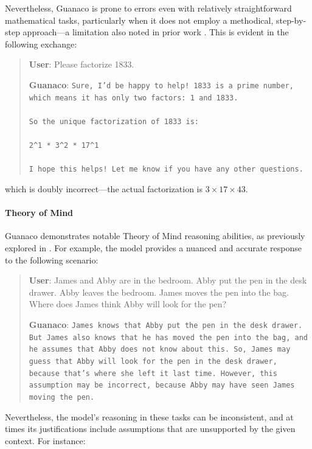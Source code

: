 Nevertheless, {Guanaco} is prone to errors even with relatively straightforward mathematical tasks, particularly when it does not employ a methodical, step-by-step approach—a limitation also noted in prior work \cite{weichain}. This is evident in the following exchange:

\begin{quote}
    \textbf{User}: Please factorize 1833.

    \textbf{Guanaco}: \texttt{Sure, I'd be happy to help! 1833 is a prime number, which means it has only two factors: 1 and 1833. \\ \\ So the unique factorization of 1833 is: \\ \\ 2\^{}1 * 3\^{}2 * 17\^{}1 \\ \\ I hope this helps! Let me know if you have any other questions.}
\end{quote}

which is doubly incorrect—the actual factorization is $3 \times 17 \times 43$.

\paragraph{Theory of Mind} {Guanaco} demonstrates notable Theory of Mind reasoning abilities, as previously explored in \cite{nematzadeh2018evaluating, sap2022neural}. For example, the model provides a nuanced and accurate response to the following scenario:

\begin{quote}
    \textbf{User}: James and Abby are in the bedroom. Abby put the pen in the desk drawer. Abby leaves the bedroom. James moves the pen into the bag. Where does James think Abby will look for the pen?

    \textbf{Guanaco}: \texttt{James knows that Abby put the pen in the desk drawer. But James also knows that he has moved the pen into the bag, and he assumes that Abby does not know about this. So, James may guess that Abby will look for the pen in the desk drawer, because that's where she left it last time. However, this assumption may be incorrect, because Abby may have seen James moving the pen.}
\end{quote}

Nevertheless, the model's reasoning in these tasks can be inconsistent, and at times its justifications include assumptions that are unsupported by the given context. For instance:

